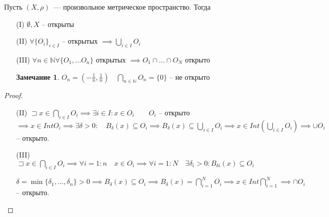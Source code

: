 \documentclass{book}
\newcommand\N{\ensuremath{\mathbb{N}}}
\renewcommand\O{\ensuremath{\emptyset}}
\theoremstyle{definition}
\newtheorem*{note}{Замечание}
\begin{document}
    \begin{theorem}

        Пусть $(X, \rho)$~--- произвольное метрическое пространство. 
        Тогда 
        \begin{enumerate}
            \item [(I)]$\O , X$ -- открыты
            \item [(II)] $\forall  \{O_i\}_{i\in I}$ -- открытых $ \implies  \bigcup\limits_{i \in  I} O_i$
            \item [(III)] $\forall n\in \N \forall \{O_1, \ldots O_n\}$ открытых $\implies  O_1\cap \ldots \cap O_N$ открыто

            \begin{note}
                $O_n = \left( -\frac{1}{n}, \frac{1}{n} \right) \quad \bigcap\limits_{n\in \N } O_n = \{0\}$ -- не открыто
            \end{note}
        \end{enumerate}
    \end{theorem}
    \begin{proof}
        \begin{itemize}
            \item [(II)] $\sqsupset x\in \bigcap\limits_{i \in  I} O_i \implies  \exists i\in I: x\in O_i\qquad O_i$ -- открыто $\implies x\in Int O_i \implies  \exists \delta >0:\quad B_{\delta}(x) \subseteq O_i \implies  B_{\delta}(x) \subseteq \bigcup\limits_{i \in  I}  O_i \implies  x\in Int\left( \bigcup\limits_{i \in  I} O_i \right)  \implies  \cup O_i$ -- открыто.
            \item [(III)] $\sqsupset x\in \bigcap\limits_{i \in  I} O_i \implies \forall i = 1:n\quad x\in O_i \implies  \forall i = 1:N\quad \exists \delta_i>0: B_{\delta i}(x) \subseteq O_i$

            $\delta = \min \{\delta_1, \ldots, \delta_n\} >0 \implies  B_{\delta}(x) \subseteq O_i \implies  B_{\delta}(x) = \bigcap\limits_{i=1} ^N O_i \implies  x\in Int \bigcap\limits_{i =1}^N \implies \cap O_i $ -- открыто.
        \end{itemize}
    \end{proof}
\end{document}
